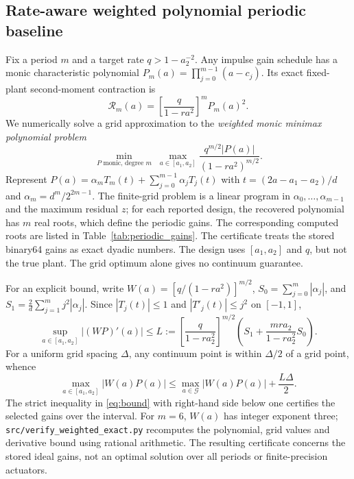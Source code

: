 \documentclass[preprint,12pt,numbers]{elsarticle}
\theoremstyle{definition}
\begin{document}
\subsection{Rate-aware weighted polynomial periodic baseline}
Fix a period $m$ and a target rate $q>1-a_2^{-2}$. Any impulse gain schedule has a monic characteristic polynomial $P_m(a)=\prod_{j=0}^{m-1}(a-c_j)$. Its exact fixed-plant second-moment contraction is
\[
\mathcal R_m(a)=\left[\frac{q}{1-ra^2}\right]^mP_m(a)^2.
\]
We numerically solve a grid approximation to the \emph{weighted monic minimax polynomial problem}
\begin{equation}\label{eq:weightedLP}
\min_{P\text{ monic, degree }m}\;\max_{a\in[a_1,a_2]}
\frac{q^{m/2}|P(a)|}{(1-ra^2)^{m/2}}.
\end{equation}
Represent $P(a)=\alpha_m T_m(t)+\sum_{j=0}^{m-1}\alpha_jT_j(t)$ with $t=(2a-a_1-a_2)/d$ and $\alpha_m=d^m/2^{2m-1}$. The finite-grid problem is a linear program in $\alpha_0,\ldots,\alpha_{m-1}$ and the maximum residual $z$; for each reported design, the recovered polynomial has
$m$ real roots, which define the periodic gains.
The corresponding computed roots are listed in
Table~\ref{tab:periodic_gains}. The certificate treats the stored binary64 gains as exact dyadic numbers. The design uses $[a_1,a_2]$ and $q$, but not the true plant. The grid optimum alone gives no continuum guarantee.

For an explicit bound, write $W(a)=[q/(1-ra^2)]^{m/2}$, $S_0=\sum_{j=0}^m|\alpha_j|$, and $S_1=\frac2d\sum_{j=1}^m j^2|\alpha_j|$. Since $|T_j(t)|\le1$ and $|T'_j(t)|\le j^2$ on $[-1,1]$,
\begin{equation}\label{eq:Lip}
\sup_{a\in[a_1,a_2]}|(WP)'(a)|\le
L:=\left[\frac{q}{1-ra_2^2}\right]^{m/2}
\left(S_1+\frac{mra_2}{1-ra_2^2}S_0\right).
\end{equation}
For a uniform grid spacing $\Delta$, any continuum point is within $\Delta/2$ of a grid point, whence
\begin{equation}\label{eq:bound}
\max_{a\in[a_1,a_2]}|W(a)P(a)|\le\max_{a\in\mathcal G}|W(a)P(a)|+\frac{L\Delta}{2}.
\end{equation}
The strict inequality in \eqref{eq:bound} with right-hand side below one certifies the selected gains over the interval. For $m=6$, $W(a)$ has integer exponent three; \texttt{src/verify\_weighted\_exact.py} recomputes the polynomial, grid values and derivative bound using rational arithmetic. The resulting certificate concerns the stored ideal gains, not an optimal solution over all periods or finite-precision actuators.
\end{document}
